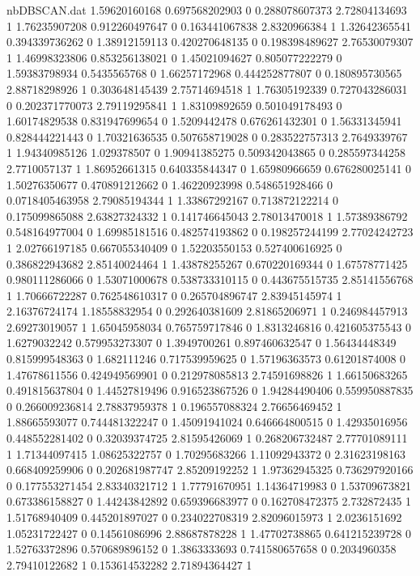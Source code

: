 \begin{filecontents}{nbDBSCAN.dat}
1.59620160168 0.697568202903 0
0.288078607373 2.72804134693 1
1.76235907208 0.912260497647 0
0.163441067838 2.8320966384 1
1.32642365541 0.394339736262 0
1.38912159113 0.420270648135 0
0.198398489627 2.76530079307 1
1.46998323806 0.853256138021 0
1.45021094627 0.805077222279 0
1.59383798934 0.5435565768 0
1.66257172968 0.444252877807 0
0.180895730565 2.88718298926 1
0.303648145439 2.75714694518 1
1.76305192339 0.727043286031 0
0.202371770073 2.79119295841 1
1.83109892659 0.501049178493 0
1.60174829538 0.831947699654 0
1.5209442478 0.676261432301 0
1.56331345941 0.828444221443 0
1.70321636535 0.507658719028 0
0.283522757313 2.7649339767 1
1.94340985126 1.029378507 0
1.90941385275 0.509342043865 0
0.285597344258 2.7710057137 1
1.86952661315 0.640335844347 0
1.65980966659 0.676280025141 0
1.50276350677 0.470891212662 0
1.46220923998 0.548651928466 0
0.0718405463958 2.79085194344 1
1.33867292167 0.713872122214 0
0.175099865088 2.63827324332 1
0.141746645043 2.78013470018 1
1.57389386792 0.548164977004 0
1.69985181516 0.482574193862 0
0.198257244199 2.77024242723 1
2.02766197185 0.667055340409 0
1.52203550153 0.527400616925 0
0.386822943682 2.85140024464 1
1.43878255267 0.670220169344 0
1.67578771425 0.980111286066 0
1.53071000678 0.538733310115 0
0.443675515735 2.85141556768 1
1.70666722287 0.762548610317 0
0.265704896747 2.83945145974 1
2.16376724174 1.18558832954 0
0.292640381609 2.81865206971 1
0.246984457913 2.69273019057 1
1.65045958034 0.765759717846 0
1.8313246816 0.421605375543 0
1.6279032242 0.579953273307 0
1.3949700261 0.897460632547 0
1.56434448349 0.815999548363 0
1.682111246 0.717539959625 0
1.57196363573 0.61201874008 0
1.47678611556 0.424949569901 0
0.212978085813 2.74591698826 1
1.66150683265 0.491815637804 0
1.44527819496 0.916523867526 0
1.94284490406 0.559950887835 0
0.266009236814 2.78837959378 1
0.196557088324 2.76656469452 1
1.88665593077 0.744481322247 0
1.45091941024 0.646664800515 0
1.42935016956 0.448552281402 0
0.32039374725 2.81595426069 1
0.268206732487 2.77701089111 1
1.71344097415 1.08625322757 0
1.70295683266 1.11092943372 0
2.31623198163 0.668409259906 0
0.202681987747 2.85209192252 1
1.97362945325 0.736297920166 0
0.177553271454 2.83340321712 1
1.77791670951 1.14364719983 0
1.53709673821 0.673386158827 0
1.44243842892 0.659396683977 0
0.162708472375 2.732872435 1
1.51768940409 0.445201897027 0
0.234022708319 2.82096015973 1
2.0236151692 1.05231722427 0
0.14561086996 2.88687878228 1
1.47702738865 0.641215239728 0
1.52763372896 0.570689896152 0
1.3863333693 0.741580657658 0
0.2034960358 2.79410122682 1
0.153614532282 2.71894364427 1

\end{filecontents}

